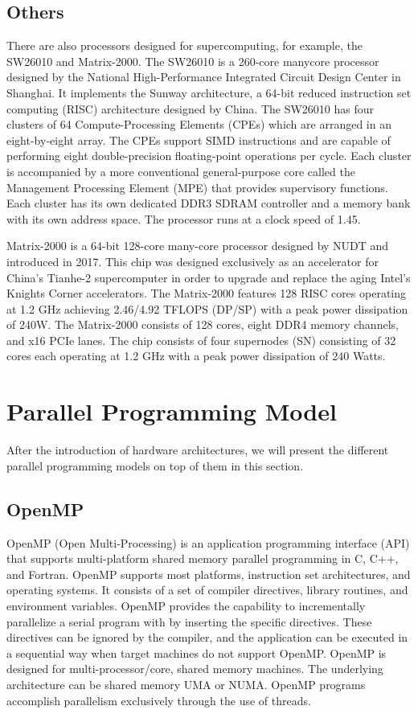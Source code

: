 \subsection{Others}

There are also processors designed for supercomputing, for example, the SW26010 and Matrix-2000. The SW26010 is a 260-core manycore processor \cite{fu2016sunway} designed by the National High-Performance Integrated Circuit Design Center in Shanghai. It implements the Sunway architecture, a 64-bit reduced instruction set computing (RISC) architecture designed by China. The SW26010 has four clusters of 64 Compute-Processing Elements (CPEs) which are arranged in an eight-by-eight array. The CPEs support SIMD instructions and are capable of performing eight double-precision floating-point operations per cycle. Each cluster is accompanied by a more conventional general-purpose core called the Management Processing Element (MPE) that provides supervisory functions. Each cluster has its own dedicated DDR3 SDRAM controller and a memory bank with its own address space. The processor runs at a clock speed of 1.45.

Matrix-2000 \cite{zhang2018mocl} is a 64-bit 128-core many-core processor designed by NUDT and introduced in 2017. This chip was designed exclusively as an accelerator for China's Tianhe-2 supercomputer in order to upgrade and replace the aging Intel's Knights Corner accelerators. The Matrix-2000 features 128 RISC cores operating at 1.2 GHz achieving 2.46/4.92 TFLOPS (DP/SP) with a peak power dissipation of 240W. The Matrix-2000 consists of 128 cores, eight DDR4 memory channels, and x16 PCIe lanes. The chip consists of four supernodes (SN) consisting of 32 cores each operating at 1.2 GHz with a peak power dissipation of 240 Watts.

\section{Parallel Programming Model}

After the introduction of hardware architectures, we will present the different parallel programming models on top of them in this section.

\subsection{OpenMP}
OpenMP (Open Multi-Processing) \cite{dagum1998openmp} is an application programming interface (API) that supports multi-platform shared memory parallel programming in C, C++, and Fortran. OpenMP supports most platforms, instruction set architectures, and operating systems. It consists of a set of compiler directives, library routines, and environment variables. OpenMP provides the capability to incrementally parallelize a serial program with by inserting the specific directives. These directives can be ignored by the compiler, and the application can be executed in a sequential way when target machines do not support OpenMP. OpenMP is designed for multi-processor/core, shared memory machines. The underlying architecture can be shared memory UMA or NUMA. OpenMP programs accomplish parallelism exclusively through the use of threads.

